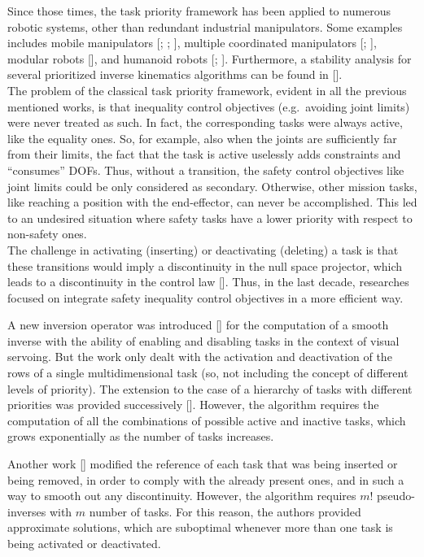 Since those times, the task priority framework has been applied to numerous robotic systems, other than redundant industrial manipulators. Some examples includes mobile manipulators [\cite{IntroTpik12}; \cite{IntroTpik13}; \cite{IntroTpik14}], multiple coordinated manipulators [\cite{IntroTpik15}; \cite{IntroTpik16}], modular robots [\cite{IntroTpik17}], and humanoid robots [\cite{IntroTpik18}; \cite{IntroTpik19}]. Furthermore, a stability analysis for several prioritized inverse kinematics algorithms can be found in [\cite{IntroTpik20}].\\


The problem of the classical task priority framework, evident in all the previous mentioned works, is that inequality control objectives (e.g.\ avoiding
joint limits) were never treated as such. In fact, the corresponding tasks were always active, like the equality ones. So, for example, also when the joints are sufficiently far from their limits, the fact that the task is active uselessly adds constraints and \enquote{consumes} DOFs.
Thus, without a transition, the safety control objectives like joint limits could be only considered as secondary. Otherwise, other mission tasks, like reaching a position with the end-effector, can never be accomplished. This led to an undesired situation where safety tasks have a lower priority with respect to non-safety ones.\\


The challenge in activating (inserting) or deactivating (deleting) a task is that these transitions would imply a discontinuity in the null space projector, which leads to a discontinuity in the control law [\cite{IntroTpik21}]. Thus, in the last decade, researches focused on integrate safety inequality control objectives in a more efficient way. 

A new inversion operator was introduced [\cite{IntroTpik22}] for the computation of a smooth inverse with the ability of enabling and disabling tasks in the context of visual servoing. But the work only dealt with the activation and deactivation of the rows of a single multidimensional task (so, not including the concept of different levels of priority). The extension to the case of a hierarchy of tasks with different priorities was provided successively [\cite{IntroTpik23}]. However, the algorithm requires the computation of all the combinations of possible active and inactive tasks, which grows exponentially as the number of tasks increases.

Another work [\cite{IntroTpik21}] modified the reference of each task that was being inserted or being removed, in order to comply with the already present ones, and in such a way to smooth out any discontinuity. However, the algorithm requires $m!$ pseudo-inverses with $m$ number of tasks. For this reason, the authors provided approximate solutions, which are suboptimal whenever more than one task is being activated or deactivated.


